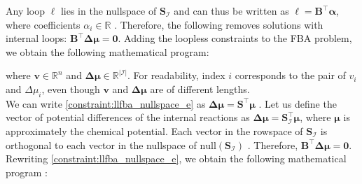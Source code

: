 Any loop $\boldsymbol \ell$ lies in the nullspace of $\mathbf S_{\mathcal{I}}$ and can thus be written as $\boldsymbol \ell = \mathbf B ^\intercal \boldsymbol \alpha$, where coefficients $\alpha_i \in \mathbb{R}$ \cite{elimination_infeasible_loops}. Therefore, the following removes solutions with internal loops: $\mathbf B^\intercal \boldsymbol{\Delta \mu} = \mathbf 0$. Adding the loopless constraints to the \textsf{FBA} problem, we obtain the following mathematical program:
where $\mathbf v \in \mathbb{R}^n$ and $\boldsymbol{\Delta \mu} \in \mathbb{R}^{|\mathcal{I}|}$. For readability, index $i$ corresponds to the pair of $v_i$ and $\Delta \mu_i$, even though $\mathbf v$ and $\boldsymbol{\Delta \mu}$ are of different lengths.\\
We can write \cref{constraint:llfba_nullspace_e} as $\boldsymbol{\Delta \mu} = \mathbf S ^\intercal \boldsymbol \mu$ \cite{noor_proof_2012, elimination_infeasible_loops, muller_fast_2013}. Let us define the vector of potential differences of the internal reactions as $\boldsymbol{\Delta \mu} = \mathbf S_\mathcal{I}^\intercal \boldsymbol \mu$, where $\boldsymbol \mu$ is approximately the chemical potential. 
Each vector in the rowspace of $\mathbf S_{\mathcal{I}}$ is orthogonal to each vector in the nullspace of $\mathrm{null}(\mathbf S_{\mathcal{I}})$ \cite{noor_proof_2012}.
Therefore, $\mathbf B^\intercal \boldsymbol{\Delta \mu} = \mathbf 0$.\\
Rewriting \cref{constraint:llfba_nullspace_e}, we obtain the following mathematical program \cite{muller_fast_2013}:
